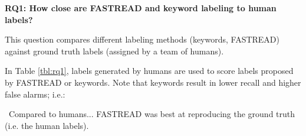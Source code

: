 \documentclass[10pt,journal,compsoc]{IEEEtran}
\newenvironment{RQ}[1]%
{\noindent\begin{minipage}[c]{\linewidth}%
\begin{bclogo}[couleur=gray!25,%
                arrondi=0.1,%
                logo=\bctrombone,%
                ombre=true]{{\normalsize ~#1}}}%
{\end{bclogo}\end{minipage}\vspace{2mm}}
\begin{document}
{\bf RQ1: How close are FASTREAD and keyword labeling to human labels?}

This question compares  different labeling methods (keywords, FASTREAD)
against  ground truth labels (assigned by a team of humans).



In Table \ref{tbl:rq1},
labels generated by humans are used to score  labels proposed by FASTREAD or keywords. Note that keywords result in lower recall and higher false alarms; i.e.:
 

\begin{RQ}{\normalsize{Compared to humans...}} 
FASTREAD was best at reproducing the ground truth (i.e. the human labels).
\end{RQ}
 
 
\end{document}
